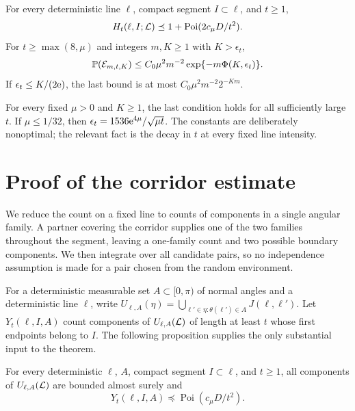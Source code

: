 \documentclass[11pt,letterpaper]{article}
\begin{document}
\begin{theorem}\label{thm:corridor}
For every deterministic line $\ell$, compact segment $I\subset\ell$, and $t\ge1$,
\begin{equation}\label{eq:fixed-line}
 H_t(\ell,I;\cL)\preceq1+\operatorname{Poi}(2c_\mu D/t^2).
\end{equation}
For $t\ge\max(8,\mu)$ and integers $m,K\ge1$ with $K>\epsilon_t$,
\begin{equation}\label{eq:corridor}
 \P(\mathcal E_{m,t,K})\le C_0\mu^2m^{-2}
                  \exp\{-m\Phi(K,\epsilon_t)\}.
\end{equation}
If $\epsilon_t\le K/(2\e)$, the last bound is at most $C_0\mu^2m^{-2}2^{-Km}$.
\end{theorem}

For every fixed $\mu>0$ and $K\ge1$, the last condition holds for all sufficiently large $t$. If $\mu\le1/32$, then $\epsilon_t=1536\e^{4\mu}/\sqrt{\mu t}$. The constants are deliberately nonoptimal; the relevant fact is the decay in $t$ at every fixed line intensity.

\section{Proof of the corridor estimate}

We reduce the count on a fixed line to counts of components in a single angular family. A partner covering the corridor supplies one of the two families throughout the segment, leaving a one-family count and two possible boundary components. We then integrate over all candidate pairs, so no independence assumption is made for a pair chosen from the random environment.

For a deterministic measurable set $A\subset[0,\pi)$ of normal angles and a deterministic line $\ell$, write $U_{\ell,A}(\eta)=\bigcup_{\ell'\in\eta:\theta(\ell')\in A}J(\ell,\ell')$. Let $Y_t(\ell,I,A)$ count components of $U_{\ell,A}(\cL)$ of length at least $t$ whose first endpoints belong to $I$. The following proposition supplies the only substantial input to the theorem.

\begin{proposition}\label{prop:one-family}
For every deterministic $\ell$, $A$, compact segment $I\subset\ell$, and $t\ge1$, all components of $U_{\ell,A}(\cL)$ are bounded almost surely and
\begin{equation}\label{eq:one-family}
 Y_t(\ell,I,A)\preceq\operatorname{Poi}(c_\mu D/t^2).
\end{equation}
\end{proposition}
\end{document}
